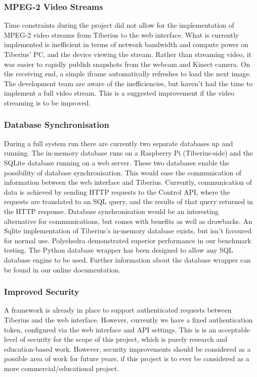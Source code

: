 \subsubsection{MPEG-2 Video Streams}
Time constraints during the project did not allow for the implementation of
\gls{MPEG-2} video streams from Tiberius to the web interface.
\newline
What is currently implemented is inefficient in terms of network bandwidth and compute power on Tiberius' PC, and the device viewing the stream. Rather than streaming video, it was easier to rapidly publish snapshots from the webcam and Kinect camera. On the receiving end, a simple iframe automatically refreshes to load the next image.
\newline
The development team are aware of the inefficiencies, but haven't had the time to implement a full video stream. This is a suggested improvement if the video streaming is to be improved.

\subsubsection{Database Synchronisation}
During a full system run there are currently two separate databases up and
running. The in-memory database runs on a Raspberry Pi (Tiberius-side) and the
SQLite database running on a web server. These two databases enable the
possibility of database synchronisation. This would ease the communication of
information between the web interface and Tiberius. Currently, communication of
data is achieved by sending HTTP requests to the Control API, where the
requests are translated to an SQL query, and the results of that query returned
in the HTTP response.
\newline
Database synchronisation would be an interesting alternative for communications,
but comes with benefits as well as drawbacks.
\newline
An Sqlite implementation of Tiberius's in-memory database exists, but isn't
favoured for normal use. Polyehedra demonstrated superior performance in
our benchmark testing. The Python database wrapper has been designed to allow
any SQL database engine to be used. Further information about the database
wrapper can be found in our online documentation.


\subsubsection{Improved Security}
A framework is already in place to support authenticated requests between
Tiberius and the web interface. However, currently we have a fixed
authentication token, configured via the web interface and API settings.
\newline
This is is an acceptable level of security for the scope of this project, which
is purely research and education-based work. However, security improvements
should be considered as a possible area of work for future years, if this
project is to ever be considered as a more commercial/educational project.

